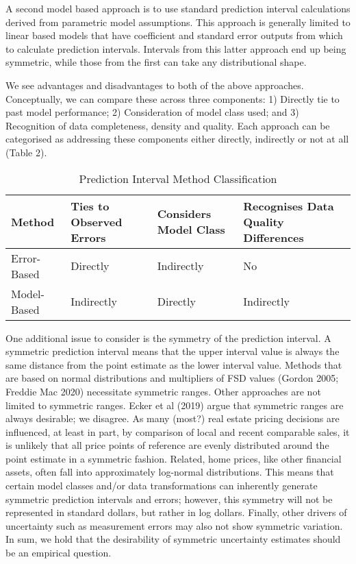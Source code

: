\documentclass[colTwo]{anon}
\theoremstyle{definition}
\begin{document}
A second model based approach is to use standard prediction interval calculations derived from parametric model assumptions.  This approach is generally limited to linear based models that have coefficient and standard error outputs from which to calculate prediction intervals.  Intervals from this latter approach end up being symmetric, while those from the first can take any distributional shape. 

We see advantages and disadvantages to both of the above approaches.   Conceptually, we can compare these across three components: 1) Directly tie to past model performance; 2) Consideration of model class used; and 3) Recognition of data completeness, density and quality.  Each approach can be categorised as addressing these components either directly, indirectly or not at all (Table 2).  

\begin{table}[h!]
\centering
\begin{tabular}{|p{1.2cm} | p{1.6cm} | p{1.6cm} | p{1.6cm} |} 
 \hline
  \textbf{Method} & \textbf{Ties to Observed Errors} & \textbf{Considers Model Class} & \textbf{Recognises Data Quality Differences} \\ [0.5ex] 
 \hline
 Error-Based & Directly & Indirectly & No \\ 
 \hline
 Model-Based & Indirectly & Directly & Indirectly \\
 \hline
\end{tabular}
\caption{Prediction Interval Method Classification}
\label{table:2}
\end{table}

One additional issue to consider is the symmetry of the prediction interval. A symmetric prediction interval means that the upper interval value is always the same distance from the point estimate as the lower interval value.  Methods that are based on normal distributions and multipliers of FSD values (Gordon 2005; Freddie Mac 2020) necessitate symmetric ranges. Other approaches are not limited to symmetric ranges.  Ecker et al (2019) argue that symmetric ranges are always desirable; we disagree.  As many (most?) real estate pricing decisions are influenced, at least in part, by comparison of local and recent comparable sales, it is unlikely that all price points of reference are evenly distributed around the point estimate in a symmetric fashion.  Related, home prices, like other financial assets, often fall into approximately log-normal distributions.  This means that certain model classes and/or data transformations can inherently generate symmetric prediction intervals and errors; however, this symmetry will not be represented in standard dollars, but rather in log dollars. Finally, other drivers of uncertainty such as measurement errors may also not show symmetric variation.  In sum, we hold that the desirability of symmetric uncertainty estimates should be an empirical question.  
\end{document}

